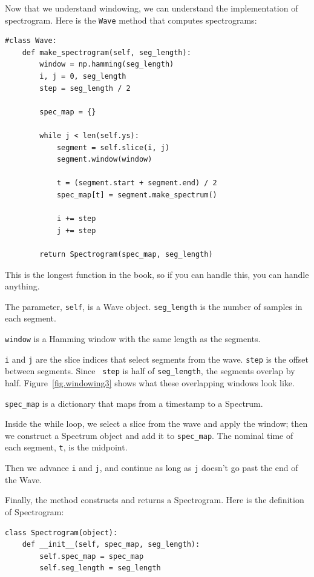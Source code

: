 \documentclass[12pt]{book}
\begin{document}
Now that we understand windowing, we can understand the
implementation of spectrogram.
Here is the {\tt Wave} method that computes spectrograms:

\begin{verbatim}
#class Wave:
    def make_spectrogram(self, seg_length):
        window = np.hamming(seg_length)
        i, j = 0, seg_length
        step = seg_length / 2

        spec_map = {}

        while j < len(self.ys):
            segment = self.slice(i, j)
            segment.window(window)

            t = (segment.start + segment.end) / 2
            spec_map[t] = segment.make_spectrum()

            i += step
            j += step

        return Spectrogram(spec_map, seg_length)
\end{verbatim}

This is the longest function in the book, so if you can handle
this, you can handle anything.

The parameter, {\tt self}, is a Wave object.
\verb"seg_length" is the number of samples in each segment.

{\tt window} is a Hamming window with the same length as the segments.

{\tt i} and {\tt j} are the slice indices that select segments from
the wave.  {\tt step} is the offset between segments.  Since {\tt
  step} is half of \verb"seg_length", the segments overlap by half.
Figure~\ref{fig.windowing3} shows what these overlapping windows look
like.

\verb"spec_map" is a dictionary that maps from a timestamp to
a Spectrum.

Inside the while loop, we select a slice from the wave and apply
the window; then we construct a Spectrum
object and add it to \verb"spec_map".  The nominal time of
each segment, {\tt t}, is the midpoint.

Then we advance {\tt i} and {\tt j}, and continue as long as {\tt j}
doesn't go past the end of the Wave.

Finally, the method constructs and returns a Spectrogram.  Here
is the definition of Spectrogram:

\begin{verbatim}
class Spectrogram(object):
    def __init__(self, spec_map, seg_length):
        self.spec_map = spec_map
        self.seg_length = seg_length
\end{verbatim}
\end{document}
